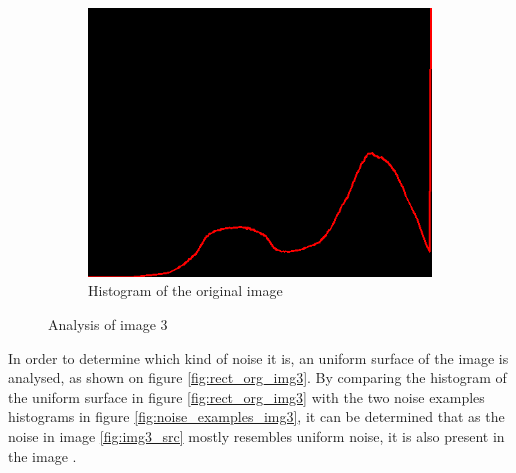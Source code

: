 \begin{figure}[H]
\begin{subfigure}[b]{0.485\textwidth}
        \includegraphics[width=\textwidth]{img3/hist_org_img3.png}
        \caption{Histogram of the original image}
        \label{fig:img3_hist}
    \end{subfigure}
    \caption{Analysis of image 3}
    \label{fig:img3}
\end{figure}
In order to determine which kind of noise it is, an uniform surface of the image is analysed, as shown on figure  \ref{fig:rect_org_img3}. By comparing the histogram of the uniform surface in figure \ref{fig:rect_org_img3} with the two noise examples histograms in figure \ref{fig:noise_examples_img3}, it can be determined that as the noise in image \ref{fig:img3_src} mostly resembles uniform noise,   it is also present in the image . 

